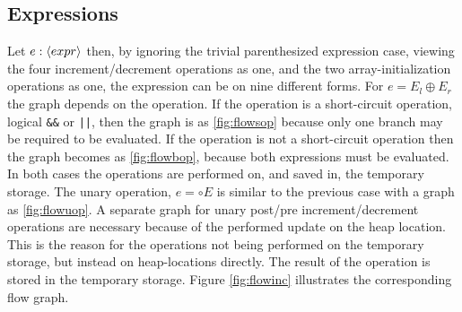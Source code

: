 \subsection{Expressions}

Let $e : \langle expr\rangle$ then, by ignoring the trivial parenthesized expression case, viewing the four increment/decrement operations as one, and the two array-initialization operations as one, the expression can be on nine different forms. For $e = E_l \oplus E_r$ the graph depends on the operation. If the operation is a short-circuit operation, logical \texttt{\&\&} or \texttt{||}, then the graph is as \ref{fig:flowsop} because only one branch may be required to be evaluated. If the operation is not a short-circuit operation then the graph becomes as \ref{fig:flowbop}, because both expressions must be evaluated. In both cases the operations are performed on, and saved in, the temporary storage. The unary operation, $e = \circ E$ is similar to the previous case with a graph as \ref{fig:flowuop}. A separate graph for unary post/pre increment/decrement operations are necessary because of the performed update on the heap location. This is the reason for the operations not being performed on the temporary storage, but instead on heap-locations directly. The result of the operation is stored in the temporary storage. Figure \ref{fig:flowinc} illustrates the corresponding flow graph.
